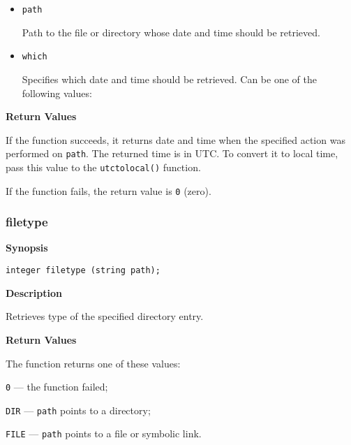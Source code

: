 \documentclass[a4paper, 10pt, titlepage]{article}
\begin{document}
\begin{itemize}
\item \texttt{path}

Path to the file or directory whose date and time should be retrieved.

\item \texttt{which}

Specifies which date and time should be retrieved. Can be one of the following values:
\end{itemize}

\textbf{Return Values}

If the function succeeds, it returns date and time when the specified action was performed on \texttt{path}. The returned time is in UTC. To convert it to local time, pass this value to the \texttt{utctolocal()} function.

If the function fails, the return value is \texttt{0} (zero).

\subsubsection{filetype}

\textbf{Synopsis}

\begin{verbatim}
integer filetype (string path);
\end{verbatim}

\textbf{Description}

Retrieves type of the specified directory entry.

\textbf{Return Values}

The function returns one of these values:
\begin{itemize*}
\item \texttt{0} --- the function failed;
\item \texttt{DIR} --- \texttt{path} points to a directory;
\item \texttt{FILE} --- \texttt{path} points to a file or symbolic link.
\end{itemize*}
\end{document}
